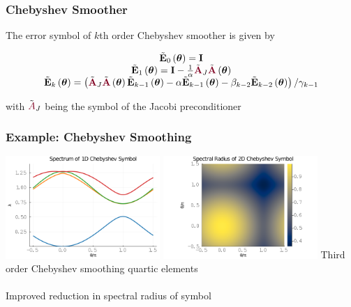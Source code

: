 \documentclass{beamer}
\begin{document}
\begin{frame}
\begin{center}
\frametitle{Chebyshev Smoother}

The error symbol of $k$th order Chebyshev smoother is given by

\begin{equation}
\begin{tabular}{c}
$\tilde{\mathbf{E}}_0 \left( \boldsymbol{\theta} \right) = \mathbf{I}$\\
$\tilde{\mathbf{E}}_1 \left( \boldsymbol{\theta} \right) = \mathbf{I} - \frac{1}{\alpha} \tilde{\color{burgundy}\mathbf{A}}_J \tilde{\color{burgundy}\mathbf{A}} \left( \boldsymbol{\theta} \right)$\\
$\tilde{\mathbf{E}}_k \left( \boldsymbol{\theta} \right) = \left( \tilde{\color{burgundy}\mathbf{A}}_J \tilde{\color{burgundy}\mathbf{A}} \left( \boldsymbol{\theta} \right) \tilde{\mathbf{E}}_{k - 1} \left( \boldsymbol{\theta} \right) - \alpha \tilde{\mathbf{E}}_{k - 1} \left( \boldsymbol{\theta} \right) - \beta_{k - 2} \tilde{\mathbf{E}}_{k - 2} \left( \boldsymbol{\theta} \right) \right) / \gamma_{k - 1}$
\end{tabular}
\end{equation}

with $\tilde{\color{burgundy}A}_J$ being the symbol of the Jacobi preconditioner

\end{center}
\end{frame}


\begin{frame}
\begin{center}
\frametitle{Example: Chebyshev Smoothing}

\includegraphics[height=3.9cm]{../img/ChebyshevSymbol1D}
\includegraphics[height=3.9cm]{../img/ChebyshevSymbol2D}
{\small Third order Chebyshev smoothing quartic elements}\\

~\\

Improved reduction in spectral radius of symbol

\end{center}
\end{frame}
\end{document}
